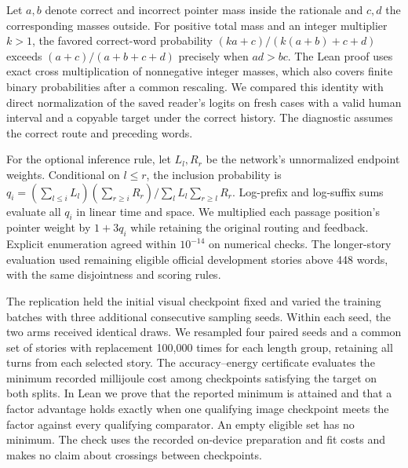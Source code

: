 Let $a,b$ denote correct and incorrect pointer mass inside the rationale and $c,d$ the corresponding masses outside. For positive total mass and an integer multiplier $k>1$, the favored correct-word probability $(ka+c)/(k(a+b)+c+d)$ exceeds $(a+c)/(a+b+c+d)$ precisely when $ad>bc$. The Lean proof uses exact cross multiplication of nonnegative integer masses, which also covers finite binary probabilities after a common rescaling. We compared this identity with direct normalization of the saved reader's logits on fresh cases with a valid human interval and a copyable target under the correct history. The diagnostic assumes the correct route and preceding words.

For the optional inference rule, let $L_l,R_r$ be the network's unnormalized endpoint weights. Conditional on $l\le r$, the inclusion probability is $q_i=(\sum_{l\le i}L_l)(\sum_{r\ge i}R_r)/\sum_l L_l\sum_{r\ge l}R_r$. Log-prefix and log-suffix sums evaluate all $q_i$ in linear time and space. We multiplied each passage position's pointer weight by $1+3q_i$ while retaining the original routing and feedback. Explicit enumeration agreed within $10^{-14}$ on numerical checks. The longer-story evaluation used remaining eligible official development stories above 448 words, with the same disjointness and scoring rules.

The replication held the initial visual checkpoint fixed and varied the training batches with three additional consecutive sampling seeds. Within each seed, the two arms received identical draws. We resampled four paired seeds and a common set of stories with replacement 100,000 times for each length group, retaining all turns from each selected story. The accuracy--energy certificate evaluates the minimum recorded millijoule cost among checkpoints satisfying the target on both splits. In Lean we prove that the reported minimum is attained and that a factor advantage holds exactly when one qualifying image checkpoint meets the factor against every qualifying comparator. An empty eligible set has no minimum. The check uses the recorded on-device preparation and fit costs and makes no claim about crossings between checkpoints.
